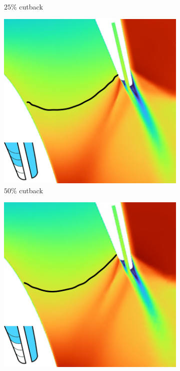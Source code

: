 \documentclass[a4paper, 11pt, oneside]{report}
\begin{document}
\begin{figure}[H]
\begin{subfigure}{.42\textwidth}
		\caption{$25\%$ cutback}
		\vspace{0.018\textheight}
	\end{subfigure}
	\begin{subfigure}{.42\textwidth}
		\centering
		\includegraphics[width=\linewidth]{figs/ps_cutbacks_choked_50.png}
		\caption{$50\%$ cutback}
		\vspace{0.018\textheight}
	\end{subfigure}
	\hspace{0.05\textwidth}
	\begin{subfigure}{.42\textwidth}
		\centering
		\includegraphics[width=\linewidth]{figs/ps_cutbacks_choked_75.png}

\end{subfigure}
\end{figure}
\end{document}
